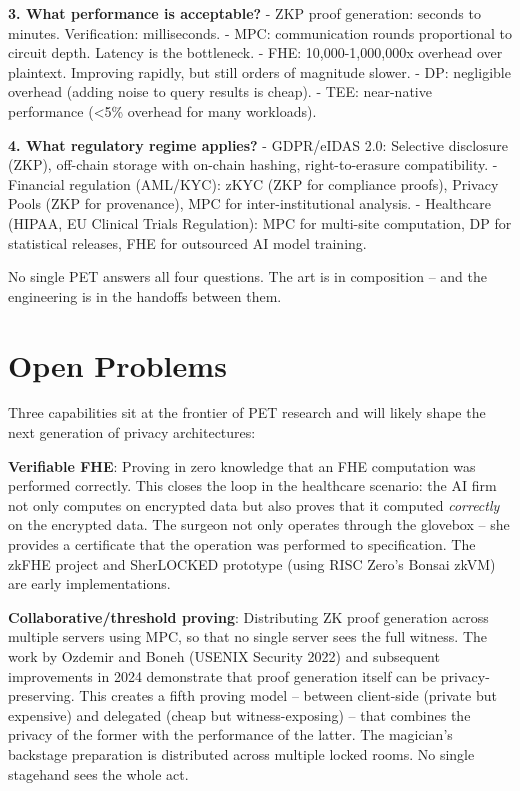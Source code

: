 \documentclass[
  11pt,
  openany]{report}
\renewcommand{\textbf}[1]{{\bfseries\color{MidnightBold}#1}}
\begin{document}
\textbf{3. What performance is acceptable?} - ZKP proof generation: seconds to
minutes. Verification: milliseconds. - MPC: communication rounds proportional to
circuit depth. Latency is the bottleneck. - FHE: 10,000-1,000,000x overhead over
plaintext. Improving rapidly, but still orders of magnitude slower. - DP:
negligible overhead (adding noise to query results is cheap). - TEE: near-native
performance (\textless5\% overhead for many workloads).

\textbf{4. What regulatory regime applies?} - GDPR/eIDAS 2.0: Selective
disclosure (ZKP), off-chain storage with on-chain hashing, right-to-erasure
compatibility. - Financial regulation (AML/KYC): zKYC (ZKP for compliance
proofs), Privacy Pools (ZKP for provenance), MPC for inter-institutional
analysis. - Healthcare (HIPAA, EU Clinical Trials Regulation): MPC for
multi-site computation, DP for statistical releases, FHE for outsourced AI model
training.

No single PET answers all four questions. The art is in composition -- and the
engineering is in the handoffs between them.

\section{Open Problems}\label{open-problems}

Three capabilities sit at the frontier of PET research and will likely shape the
next generation of privacy architectures:

\textbf{Verifiable FHE}: Proving in zero knowledge that an FHE computation was
performed correctly. This closes the loop in the healthcare scenario: the AI
firm not only computes on encrypted data but also proves that it computed
\emph{correctly} on the encrypted data. The surgeon not only operates through
the glovebox -- she provides a certificate that the operation was performed to
specification. The zkFHE project and SherLOCKED prototype (using RISC Zero's
Bonsai zkVM) are early implementations.

\textbf{Collaborative/threshold proving}: Distributing ZK proof generation
across multiple servers using MPC, so that no single server sees the full
witness. The work by Ozdemir and Boneh (USENIX Security 2022) and subsequent
improvements in 2024 demonstrate that proof generation itself can be
privacy-preserving. This creates a fifth proving model -- between client-side
(private but expensive) and delegated (cheap but witness-exposing) -- that
combines the privacy of the former with the performance of the latter. The
magician's backstage preparation is distributed across multiple locked rooms. No
single stagehand sees the whole act.
\end{document}
